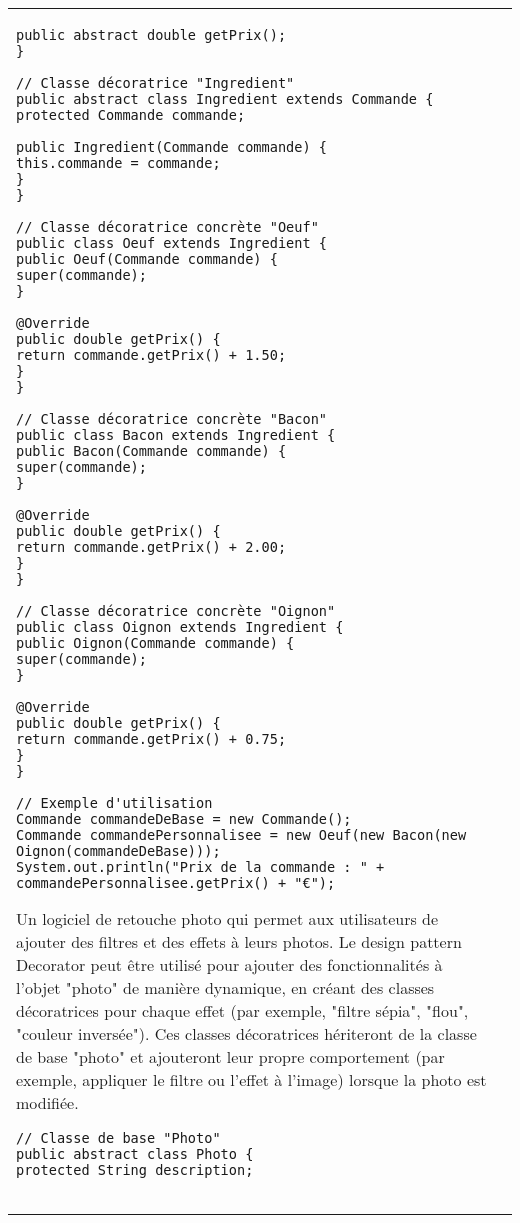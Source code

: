 \begin{table}[H]
\begin{adjustbox}{max width=\textwidth}
\begin{tabular}{l|p{\textwidth}}
\begin{minipage}[tl]{0.5\textwidth}
\begin{minipage}[b]{1\textwidth}
\begin{lstlisting}[style=monstyle]
public abstract double getPrix();
}

// Classe décoratrice "Ingredient"
public abstract class Ingredient extends Commande {
protected Commande commande;

public Ingredient(Commande commande) {
this.commande = commande;
}
}

// Classe décoratrice concrète "Oeuf"
public class Oeuf extends Ingredient {
public Oeuf(Commande commande) {
super(commande);
}

@Override
public double getPrix() {
return commande.getPrix() + 1.50;
}
}

// Classe décoratrice concrète "Bacon"
public class Bacon extends Ingredient {
public Bacon(Commande commande) {
super(commande);
}

@Override
public double getPrix() {
return commande.getPrix() + 2.00;
}
}

// Classe décoratrice concrète "Oignon"
public class Oignon extends Ingredient {
public Oignon(Commande commande) {
super(commande);
}

@Override
public double getPrix() {
return commande.getPrix() + 0.75;
}
}

// Exemple d'utilisation
Commande commandeDeBase = new Commande();
Commande commandePersonnalisee = new Oeuf(new Bacon(new Oignon(commandeDeBase)));
System.out.println("Prix de la commande : " + commandePersonnalisee.getPrix() + "€");
\end{lstlisting}
\end{minipage}

\end{minipage}
%
%
%
\hspace{6mm}
\begin{minipage}[tr]{0.5\textwidth}
\begin{minipage}[t]{1\textwidth}
Un logiciel de retouche photo qui permet aux utilisateurs de ajouter des filtres et des effets à leurs photos. Le design pattern Decorator peut être utilisé pour ajouter des fonctionnalités à l'objet "photo" de manière dynamique, en créant des classes décoratrices pour chaque effet (par exemple, "filtre sépia", "flou", "couleur inversée"). Ces classes décoratrices hériteront de la classe de base "photo" et ajouteront leur propre comportement (par exemple, appliquer le filtre ou l'effet à l'image) lorsque la photo est modifiée.
\end{minipage}
\begin{minipage}[b]{1\textwidth}
\begin{lstlisting}[style=monstyle]
// Classe de base "Photo"
public abstract class Photo {
protected String description;


\end{lstlisting}
\end{minipage}
\end{minipage}
\end{tabular}
\end{adjustbox}
\end{table}
